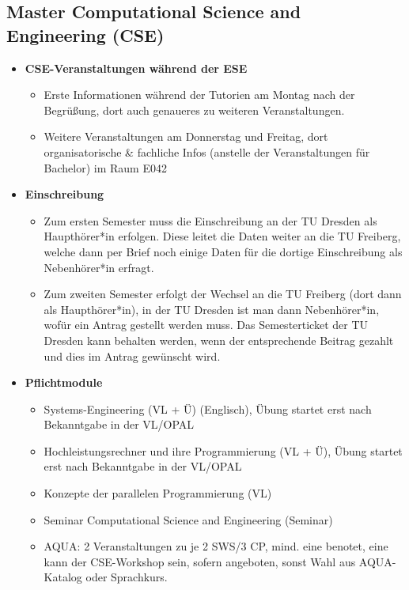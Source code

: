 \documentclass[a4paper,12pt]{report}
\begin{document}
\subsection{Master Computational Science and Engineering (CSE)}
\begin{itemize}
    \item \textbf{CSE-Veranstaltungen während der ESE}
    \begin{itemize}
        \item Erste Informationen während der Tutorien am Montag nach der Begrüßung, dort auch genaueres zu weiteren Veranstaltungen.
        \item Weitere Veranstaltungen am Donnerstag und Freitag, dort organisatorische \& fachliche Infos (anstelle der Veranstaltungen für Bachelor) im Raum E042
    \end{itemize}
    \item \textbf{Einschreibung}
    \begin{itemize}
        \item Zum ersten Semester muss die Einschreibung an der TU Dresden als Haupthörer*in erfolgen. Diese leitet die Daten weiter an die TU Freiberg, welche dann per Brief noch einige Daten für die dortige Einschreibung als Nebenhörer*in erfragt. 
        \item Zum zweiten Semester erfolgt der Wechsel an die TU Freiberg (dort dann als Haupthörer*in), in der TU Dresden ist man dann Nebenhörer*in, wofür ein Antrag gestellt werden muss. Das Semesterticket der TU Dresden kann behalten werden, wenn der entsprechende Beitrag gezahlt und dies im Antrag gewünscht wird.
    \end{itemize}
    \item \textbf{Pflichtmodule}
    \begin{itemize}
        \item Systems-Engineering (VL + Ü) (Englisch), Übung startet erst nach Bekanntgabe in der VL/OPAL
        \item Hochleistungsrechner und ihre Programmierung (VL + Ü), Übung startet erst nach Bekanntgabe in der VL/OPAL
        \item Konzepte der parallelen Programmierung (VL)
        \item Seminar Computational Science and Engineering (Seminar)
        \item AQUA: 2 Veranstaltungen zu je 2 SWS/3 CP, mind. eine benotet, eine kann der CSE-Workshop sein, sofern angeboten, sonst Wahl aus AQUA-Katalog oder Sprachkurs.
    \end{itemize}

\end{itemize}
\end{document}
